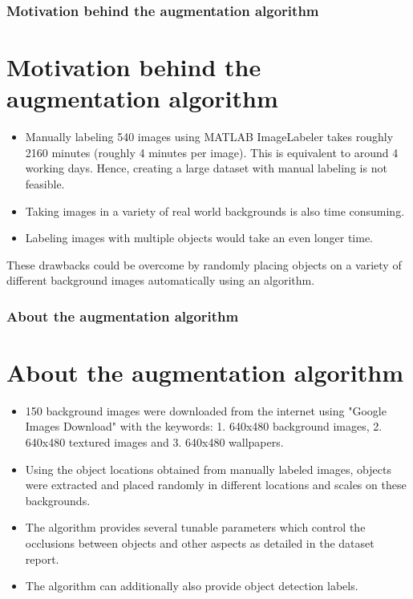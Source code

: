 \documentclass{beamer}
\begin{document}
\begin{frame}
	\frametitle{Motivation behind the augmentation algorithm}
	\section{Motivation behind the augmentation algorithm}
		\begin{itemize}
		\item Manually labeling 540 images using MATLAB ImageLabeler takes roughly 2160 minutes (roughly 4 minutes per image). This is equivalent to around 4 working days. Hence, creating a large dataset with manual labeling is not feasible.
		\item Taking images in a variety of real world backgrounds is also time consuming.
		\item Labeling images with multiple objects would take an even longer time.
	\end{itemize}
	
These drawbacks could be overcome by randomly placing objects on a variety of different background images automatically using an algorithm.
\end{frame}

\begin{frame}
	\frametitle{About the augmentation algorithm}
	\section{About the augmentation algorithm}
		\begin{itemize}
			\item 150 background images were downloaded from the internet using "Google Images Download" \cite{google_images_download} with the keywords: 1. 640x480 background images, 2. 640x480 textured images and 3. 640x480 wallpapers.
			\vspace{3mm}
			\item Using the object locations obtained from manually labeled images, objects were extracted and placed randomly in different locations and scales on these backgrounds.
			\vspace{3mm}
			\item The algorithm provides several tunable parameters which control the occlusions between objects and other aspects as detailed in the dataset report.
			\vspace{3mm}
			\item The algorithm can additionally also provide object detection labels.
		\end{itemize}
\end{frame}
\end{document}
